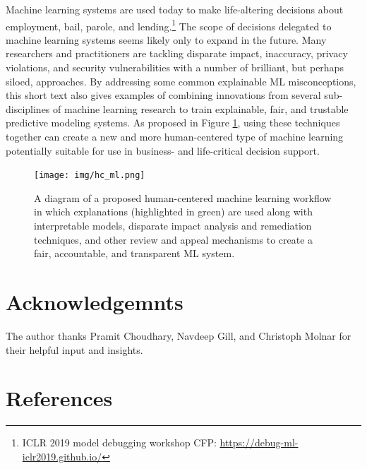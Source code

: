 \documentclass[fleqn]{article}
\begin{document}
Machine learning systems are used today to make life-altering decisions about employment, bail, parole, and lending.\footnote{ICLR 2019 model debugging workshop CFP: \url{https://debug-ml-iclr2019.github.io/}} The scope of decisions delegated to machine learning systems seems likely only to expand in the future. Many researchers and practitioners are tackling disparate impact, inaccuracy, privacy violations, and security vulnerabilities with a number of brilliant, but perhaps siloed, approaches. By addressing some common explainable ML misconceptions, this short text also gives examples of combining innovations from several sub-disciplines of machine learning research to train explainable, fair, and trustable predictive modeling systems. As proposed in Figure \ref{fig:hc_ml}, using these techniques together can create a new and more human-centered type of machine learning potentially suitable for use in business- and life-critical decision support.\\

\vspace{100pt}

\begin{figure}[htb!]
	\begin{center}
		\texttt{[image: img/hc\_ml.png]}
		\caption{A diagram of a proposed human-centered machine learning workflow in which explanations (highlighted in green) are used along with interpretable models, disparate impact analysis and remediation techniques, and other review and appeal mechanisms to create a fair, accountable, and transparent ML system.}
		\label{fig:hc_ml}
	\end{center}
\end{figure}

\section*{Acknowledgemnts}

The author thanks Pramit Choudhary, Navdeep Gill, and Christoph Molnar for their helpful input and insights. 

\section*{References}
\small


\end{document}
